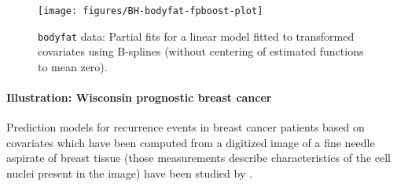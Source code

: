 \documentclass{article}
\newcommand{\Robject}[1]{\texttt{#1}}
\begin{document}
\begin{figure}[t]
\begin{center}
\texttt{[image: figures/BH-bodyfat-fpboost-plot]}
\caption{\Robject{bodyfat} data: Partial fits for a linear model fitted to
  transformed covariates using B-splines (without centering of estimated
  functions to mean zero). \label{bodyfat-fpboost-plot}}
\end{center}
\end{figure}



\paragraph{Illustration: Wisconsin prognostic breast cancer}


Prediction models for recurrence events in breast cancer patients 
based on covariates which have been computed from a digitized image of a
fine needle aspirate of breast tissue (those measurements describe
characteristics of the cell nuclei present in the image) have been studied
by \citet{street1995} \citep[the data is part of the UCI repository][]{uci1998}.
\end{document}
